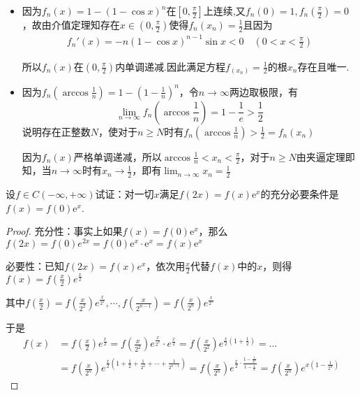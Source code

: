 \begin{xiti}
\begin{enumerate}
	\end{enumerate}
\begin{solution}
	\begin{itemize}
		\item 因为$f_n(x)=1-(1-\cos x)^n$在$[0,\frac{\pi}{2}]$上连续,又$f_n(0)=1,f_n(\frac{\pi}{2})=0$，故由介值定理知存在$x\in(0,\frac{\pi}{2})$使得$f_{n}(x_n)=\frac{1}{2}$且因为
		\begin{align*}
		f_{n}'(x)=-n(1-\cos x)^{n-1} \sin x<0 \quad\left(0<x<\frac{\pi}{2}\right)
		\end{align*}
		
		所以$f_{n}(x)$在$(0,\frac{\pi}{2})$内单调递减.因此满足方程$f_(x_n)=\frac{1}{2}$的根$x_{n}$存在且唯一.
		\item 因为$f_{n}\left(\arccos \frac{1}{n}\right)=1-\left(1-\frac{1}{n}\right)^{n}$，令$n \to \infty $两边取极限，有
		\[ 
		\lim _{n \rightarrow \infty} f_{n}\left(\arccos \frac{1}{n}\right)=1-\frac{1}{e}>\frac{1}{2}
		\]
		说明存在正整数$N$，使对于$n\ge N$时有$f_{n}\left(\arccos \frac{1}{n}\right)>\frac{1}{2}=f_{n}\left(x_{n}\right)$
		
		因为$f_{n}(x)$严格单调递减，所以$\arccos \frac{1}{n}<x_{n}<\frac{\pi}{2}$，对于$n\ge N$由夹逼定理即知，当$n\to \infty $时有$x_{n} \to \frac{1}{2}$，即有$\lim_{n \rightarrow \infty}x_n=\frac{1}{2}$
	\end{itemize}
\end{solution}
\item 设$f \in C ( - \infty , + \infty )$试证：对一切$x$满足$f(2x)=f(x)\mathrm{e}^{x}$的充分必要条件是$f(x)=f(0)\mathrm{e}^{x}$.
\begin{proof}
	充分性：事实上如果$f(x)=f(0)\mathrm{e}^{x}$，那么$f(2x)=f(0)e^{2x}=f(0)\mathrm{e}^{x}\cdot \mathrm{e}^{x}=f(x)\mathrm{e}^{x}$
	
	必要性：已知$f(2x)=f(x)e^x$，依次用$\frac{x}{2}$代替$f(x)$中的$x$，则得$f(x)=f(\frac{x}{2})e^{\frac{x}{2}}$
	
	其中$f(\frac{x}{2})=f(\frac{x}{2^2})e^{\frac{x}{2^2}},\cdots,
	f(\frac{x}{2^{n-1}})=f(\frac{x}{2^{{n}}})e^{\frac{x}{2^{n}}}$

	于是
	\begin{align*}
	f(x)&=f\left(\frac{x}{2}\right) e^{\frac{x}{2}}=f\left(\frac{x}{2^{2}}\right) e^{\frac{x}{2^{2}}} \cdot e^{\frac{x}{2}}=f\left(\frac{x}{2^{2}}\right) e^{\frac{x}{2}\left(1+\frac{1}{2}\right)}=\dots\\
	&=f(\frac{x}{2^n})e^{\frac{x}{2}(1+\frac{1}{2}+\frac{1}{2^2}+\cdots +\frac{1}{2^{n-1}})}=f(\frac{x}{2^{n}})e^{\frac{x}{2}\cdot\frac{1-\frac{1}{2^n}}{1-\frac{1}{2}}}=f(\frac{x}{2^{n}})e^{x(1-\frac{1}{2^n})}
	\end{align*}
	

\end{proof}
\end{xiti}
